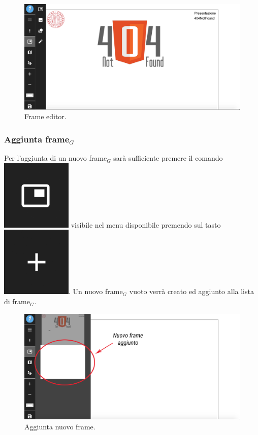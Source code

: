 \begin{figure}[!h]
\begin{center}
\includegraphics[scale=0.35]{img/frame_editor_screen.png}
\caption{Frame editor.}
\end{center}
\end{figure}

\newpage
\subsubsection{Aggiunta frame$_G$}
Per l'aggiunta di un nuovo frame$_G$ sarà sufficiente premere il comando \includegraphics[scale=0.4]{img/add_frame.png} visibile nel menu disponibile premendo sul tasto \includegraphics[scale=0.4]{img/add_object.png}. Un nuovo frame$_G$ vuoto verrà creato ed aggiunto alla lista di frame$_G$.

\begin{figure}[h]
\begin{center}
\includegraphics[scale=0.3]{img/screen_add_frame.png}
\caption{Aggiunta nuovo frame.}
\end{center}
\end{figure}

